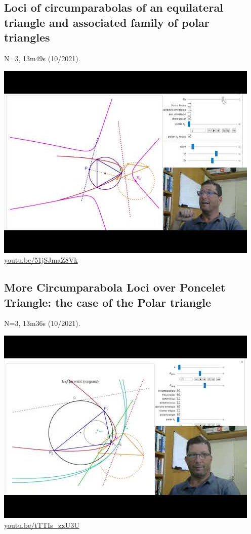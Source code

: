 \documentclass[12pt]{amsart}
\begin{document}
\subsection{Loci of circumparabolas of an equilateral triangle and associated family of polar triangles}
\label{vid:51jSJmaZ8Vk}
\noindent N=3, 13m49s (10/2021). 
\begin{center}\includegraphics[width=.5\textwidth]{pics/51jSJmaZ8Vk.jpg} \\ 
\href{https://youtu.be/51jSJmaZ8Vk}{\url{youtu.be/51jSJmaZ8Vk}}\end{center}
% 
\subsection{More Circumparabola Loci over Poncelet Triangle: the case of the Polar triangle}
\label{vid:tTTIs_zxU3U}
\noindent N=3, 13m36s (10/2021). 
\begin{center}\includegraphics[width=.5\textwidth]{pics/tTTIs_zxU3U.jpg} \\ 
\href{https://youtu.be/tTTIs_zxU3U}{\url{youtu.be/tTTIs\_zxU3U}}\end{center}
% 
\end{document}
